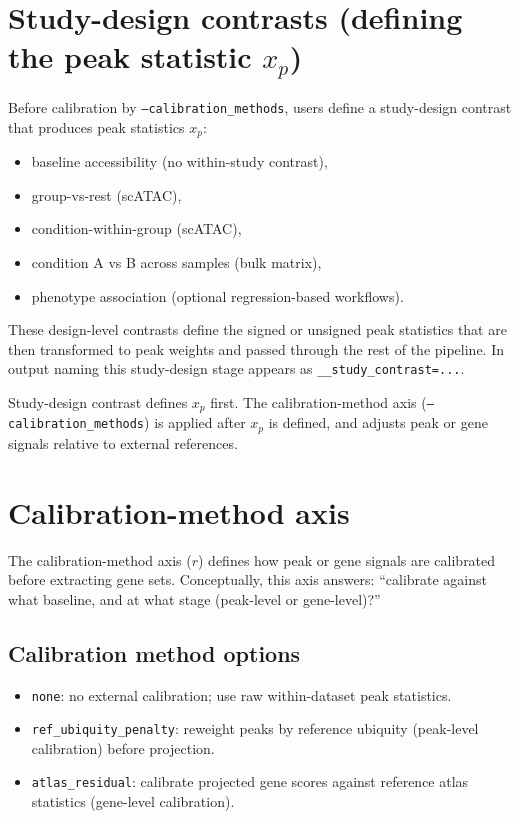 \documentclass[11pt]{article}
\begin{document}
\section{Study-design contrasts (defining the peak statistic $x_p$)}
\label{sec:study_design_contrast}
Before calibration by \texttt{--calibration\_methods}, users define a study-design contrast that produces peak statistics $x_p$:
\begin{itemize}[leftmargin=2em]
\item baseline accessibility (no within-study contrast),
\item group-vs-rest (scATAC),
\item condition-within-group (scATAC),
\item condition A vs B across samples (bulk matrix),
\item phenotype association (optional regression-based workflows).
\end{itemize}
These design-level contrasts define the signed or unsigned peak statistics that are then transformed to peak weights and passed through the rest of the pipeline.
In output naming this study-design stage appears as \texttt{\_\_study\_contrast=...}.

Study-design contrast defines $x_p$ first. The calibration-method axis (\texttt{--calibration\_methods}) is applied after $x_p$ is defined, and adjusts peak or gene signals relative to external references.

\section{Calibration-method axis}
\label{sec:contrast_axis}
The calibration-method axis ($r$) defines how peak or gene signals are calibrated before extracting gene sets.
Conceptually, this axis answers: ``calibrate against what baseline, and at what stage (peak-level or gene-level)?''

\subsection{Calibration method options}
\begin{itemize}[leftmargin=2em]
\item \texttt{none}: no external calibration; use raw within-dataset peak statistics.
\item \texttt{ref\_ubiquity\_penalty}: reweight peaks by reference ubiquity (peak-level calibration) before projection.
\item \texttt{atlas\_residual}: calibrate projected gene scores against reference atlas statistics (gene-level calibration).
\end{itemize}
\end{document}
